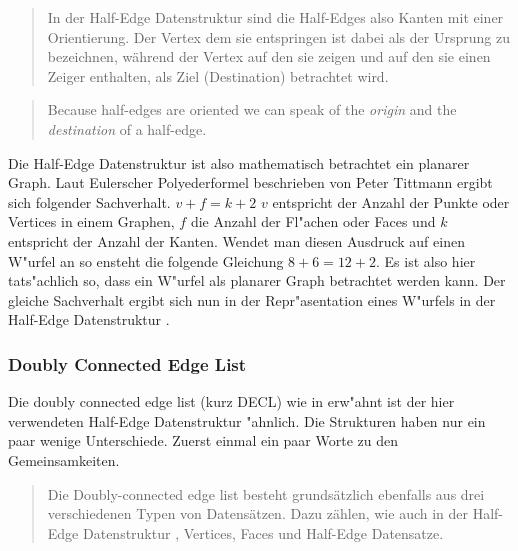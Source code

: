 \documentclass[pagesize, paper=a4, fontsize=12pt,titlepage=true, headings=small, headnosepline, abstractoff, liststotoc, nochapterprefix, plainheadsepline]{scrreprt}
\newcommand{\HES}{Half-Edge Datenstruktur }
\begin{document}
\begin{quote}In der Half-Edge Datenstruktur sind die Half-Edges also Kanten mit einer Orientierung. Der Vertex dem sie entspringen ist dabei als der Ursprung zu bezeichnen, w{\"a}hrend der Vertex auf den sie zeigen und auf den sie einen Zeiger enthalten, als Ziel (Destination) betrachtet wird. \cite[S.~31]{vanMarkdeBerg.2008}\end{quote}

\begin{quote}{\glqq}Because half-edges are oriented we can speak of the \textit{origin }and the \textit{destination }of a half-edge.{\grqq} \cite[S.~31]{vanMarkdeBerg.2008}\end{quote}

Die \HES ist also mathematisch betrachtet ein planarer Graph. Laut Eulerscher Polyederformel beschrieben von Peter Tittmann \cite[S.~47--50]{Tittmann.2011} ergibt sich folgender Sachverhalt. \(v + f = k + 2\) \(v\) entspricht der Anzahl der Punkte oder Vertices in einem Graphen, \(f\) die Anzahl der Fl"achen oder Faces und \(k\) entspricht der Anzahl der Kanten. Wendet man diesen Ausdruck auf einen W"urfel an so ensteht die folgende Gleichung \(8 + 6 = 12 + 2\). Es ist also hier tats"achlich so, dass ein W"urfel als planarer Graph betrachtet werden kann. Der gleiche Sachverhalt ergibt sich nun in der Repr"asentation eines W"urfels in der \HES.

			\subsubsection {Doubly Connected Edge List}
				Die doubly connected edge list (kurz DECL) wie in \cite{vanMarkdeBerg.2008} erw"ahnt ist der hier verwendeten \HES "ahnlich. Die Strukturen haben nur ein paar wenige Unterschiede. Zuerst einmal ein paar Worte zu den Gemeinsamkeiten. \begin{quote}Die Doubly-connected edge list besteht grunds{\"a}tzlich ebenfalls aus drei verschiedenen Typen von Datens{\"a}tzen. Dazu z{\"a}hlen, wie auch in der \HES, Vertices, Faces und Half-Edge Datens{\dq}atze. \cite[S.~31]{vanMarkdeBerg.2008}\end{quote}
\end{document}

